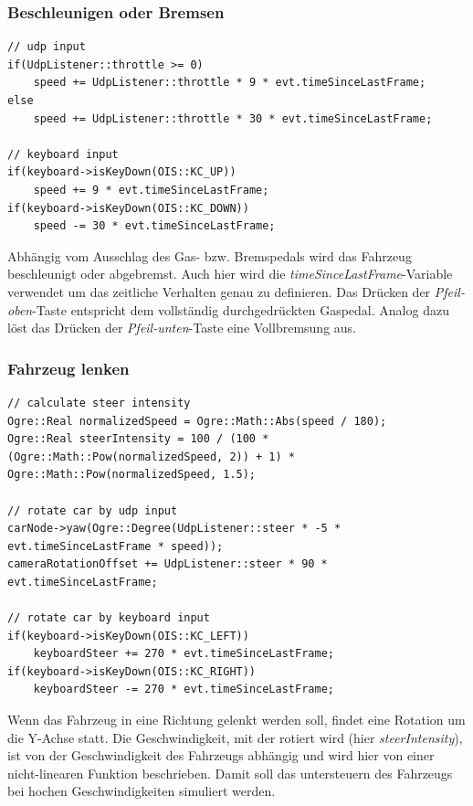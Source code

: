 \subsubsection*{Beschleunigen oder Bremsen}
\begin{lstlisting}[caption={Beschleunigen oder Bremsen},label={beschleunigen_oder_bremsen}]
// udp input
if(UdpListener::throttle >= 0)
	speed += UdpListener::throttle * 9 * evt.timeSinceLastFrame;
else
	speed += UdpListener::throttle * 30 * evt.timeSinceLastFrame;

// keyboard input
if(keyboard->isKeyDown(OIS::KC_UP))
	speed += 9 * evt.timeSinceLastFrame;
if(keyboard->isKeyDown(OIS::KC_DOWN))
	speed -= 30 * evt.timeSinceLastFrame;
\end{lstlisting}
Abhängig vom Ausschlag des Gas- bzw. Bremspedals wird das Fahrzeug beschleunigt oder abgebremst. Auch hier wird die \textit{timeSinceLastFrame}-Variable verwendet um das zeitliche Verhalten genau zu definieren. Das Drücken der \textit{Pfeil-oben}-Taste entspricht dem vollständig durchgedrückten Gaspedal. Analog dazu löst das Drücken der \textit{Pfeil-unten}-Taste eine Vollbremsung aus.

\subsubsection*{Fahrzeug lenken}
\begin{lstlisting}[caption={Fahrzeug lenken},label={fahrzeug_lenken}]
// calculate steer intensity
Ogre::Real normalizedSpeed = Ogre::Math::Abs(speed / 180);
Ogre::Real steerIntensity = 100 / (100 * (Ogre::Math::Pow(normalizedSpeed, 2)) + 1) * Ogre::Math::Pow(normalizedSpeed, 1.5);

// rotate car by udp input
carNode->yaw(Ogre::Degree(UdpListener::steer * -5 * evt.timeSinceLastFrame * speed));
cameraRotationOffset += UdpListener::steer * 90 * evt.timeSinceLastFrame;

// rotate car by keyboard input
if(keyboard->isKeyDown(OIS::KC_LEFT))
	keyboardSteer += 270 * evt.timeSinceLastFrame;
if(keyboard->isKeyDown(OIS::KC_RIGHT))
	keyboardSteer -= 270 * evt.timeSinceLastFrame;
\end{lstlisting}
Wenn das Fahrzeug in eine Richtung gelenkt werden soll, findet eine Rotation um die Y-Achse statt. Die Geschwindigkeit, mit der rotiert wird (hier \textit{steerIntensity}), ist von der Geschwindigkeit des Fahrzeugs abhängig und wird hier von einer nicht-linearen Funktion beschrieben. Damit soll das \gls{untersteuern} des Fahrzeugs bei hochen Geschwindigkeiten simuliert werden.

